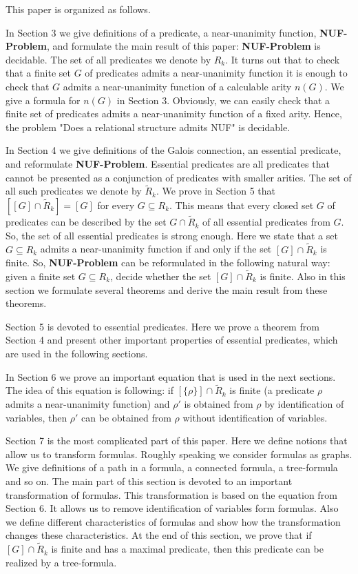 \documentclass{au}
\theoremstyle{plain}
\theoremstyle{definition}
\theoremstyle{remark}
\numberwithin{equation}{section}
\begin{document}
This paper is organized as follows.

In Section 3 we give definitions of a predicate, a near-unanimity function,
\textbf{NUF-Problem}, and formulate the main result of this paper:
\textbf{NUF-Problem} is decidable.
The set of all predicates we denote by $R_{k}.$
It turns out that to check that a finite set $G$ of predicates admits a near-unanimity function
it is enough to check that $G$ admits a near-unanimity function of a calculable arity $n(G).$
We give a formula for $n(G)$ in Section 3.
Obviously, we can easily check that a finite set of predicates
admits a near-unanimity function of a fixed arity.
Hence, the problem "Does a relational structure admits NUF" is decidable.

In Section 4 we
give definitions of the Galois connection, an essential predicate, and reformulate \textbf{NUF-Problem}.
Essential predicates are all predicates that cannot be presented as a conjunction
of predicates with smaller arities.
The set of all such predicates we denote by $\widetilde R_{k}.$
We prove in Section 5 that $[[G]\cap \widetilde R_{k}]=[G]$
for every $G\subseteq R_{k}.$
This means that every closed set $G$ of predicates
can be described by the set $G\cap \widetilde R_{k}$ of all essential predicates from $G.$
So, the set of all essential predicates is strong enough.
Here we state that a set $G\subseteq R_{k}$ admits a near-unanimity function if and only if
the set $[G]\cap \widetilde R_{k}$ is finite.
So, \textbf{NUF-Problem} can be reformulated in the following natural way:
given a finite set $G\subseteq R_{k}$, decide whether
the set $[G] \cap \widetilde R_{k}$ is finite.
Also in this section we formulate several theorems and
derive the main result from these theorems.

Section 5 is devoted to essential predicates.
Here we prove a theorem from Section 4
and present other important properties of essential predicates, which are 
used in the following sections.

In Section 6 we prove an important equation that is used in the next sections.
The idea of this equation is following:
if $[\{\rho\}]\cap \widetilde R_{k}$ is finite
(a predicate $\rho$ admits a near-unanimity function)
and $\rho'$ is obtained from $\rho$
by identification of variables, then $\rho'$ can be obtained from $\rho$ without identification of variables.

Section 7 is the most complicated part of this paper.
Here we define notions that allow us to transform formulas.
Roughly speaking we consider formulas as graphs.
We give definitions of a path in a formula, a connected formula, a tree-formula and so on.
The main part of this section is devoted to an important transformation of formulas.
This transformation is based on the equation from Section 6.
It allows us to remove identification of variables form formulas.
Also we define different characteristics of formulas and show
how the transformation changes these characteristics.
At the end of this section, we prove that if $[G]\cap \widetilde R_{k}$ is finite
and has a maximal predicate, then this predicate can be realized by a tree-formula.
\end{document}
